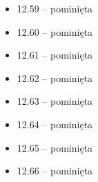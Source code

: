 \begin{multicols}{3}
\begin{itemize}
    \item 12.59 -- pominięta
    \item 12.60 -- pominięta
    \item 12.61 -- pominięta
    \item 12.62 -- pominięta
    \item 12.63 -- pominięta
    \item 12.64 -- pominięta
    \item 12.65 -- pominięta
    \item 12.66 -- pominięta

\end{itemize}
\end{multicols}
